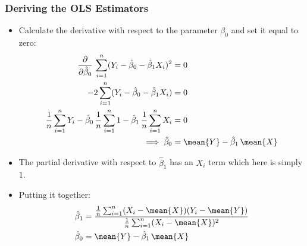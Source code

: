 \begin{frame}
\frametitle{Deriving the OLS Estimators}
\begin{itemize}
\item Calculate the derivative with respect to the parameter $\beta_{0}$ and set it equal to zero:
\begin{align*}
\frac{\partial}{\partial\hat{\beta}_{0}}\,
\sum_{i=1}^{n}(Y_{i}-\hat{\beta}_{0}-\hat{\beta}_{1}X_{i})^{2}
  & = 0\\
  -2 \sum_{i=1}^{n}(Y_{i}-\hat{\beta}_{0}-\hat{\beta}_{1}X_{i})
  & = 0\\
  \frac{1}{n}\sum_{i=1}^{n}Y_{i}
  -\hat{\beta}_{0}\,\frac{1}{n}\sum_{i=1}^{n}1
  -\hat{\beta}_{1}\,\frac{1}{n}\sum_{i=1}^{n}X_{i} & = 0\\
\implies
  \hat{\beta}_{0}
  & = \mean{Y} - \hat{\beta}_{1}\,\mean{X}
\end{align*}
\item The partial derivative with respect to $\hat{\beta}_{1}$ has an $X_{i}$ term which here is simply $1$. 
\item Putting it together:
\begin{align*}
  \hat{\beta}_{1}
  & = \frac{\frac{1}{n}\sum_{i=1}^{n}(X_{i}-\mean{X})(Y_{i}-\mean{Y})}{\frac{1}{n}\sum_{i=1}^{n}(X_{i}-\mean{X})^{2}}\\
  \hat{\beta}_{0}
  & = \mean{Y} - \hat{\beta}_{1}\,\mean{X}
\end{align*}
\end{itemize}
\end{frame}

